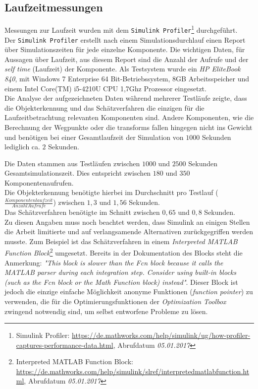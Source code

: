 \subsection{Laufzeitmessungen}
\label{sec_laufzeit}
Messungen zur Laufzeit wurden mit dem \texttt{Simulink Profiler}\footnote{Simulink Profiler: \url{https://de.mathworks.com/help/simulink/ug/how-profiler-captures-performance-data.html}, Abrufdatum \textit{05.01.2017}} durchgeführt.\\ Der \texttt{Simulink Profiler} erstellt nach einem Simulationsdurchlauf einen Report über Simulationszeiten für jede einzelne Komponente. Die wichtigen Daten, für Aussagen über Laufzeit, aus diesem Report sind die Anzahl der Aufrufe und der \textit{self time} (Laufzeit) der Komponente. Als Testsystem wurde ein \textit{HP EliteBook 840}, mit Windows 7 Enterprise 64 Bit-Betriebssystem, $8$GB Arbeitsspeicher und einem Intel Core(TM) i5-4210U CPU 1,7Ghz Prozessor eingesetzt. \\
Die Analyse der aufgezeichneten Daten während mehrerer Testläufe zeigte, dass die Objekterkennung und das Schätzverfahren die einzigen für die Laufzeitbetrachtung relevanten Komponenten sind. Andere Komponenten, wie die Berechnung der Wegpunkte oder die \glspl{transform} fallen hingegen nicht ins Gewicht und benötigen bei einer Gesamtlaufzeit der Simulation von $1000$ Sekunden lediglich ca. $2$ Sekunden. 

Die Daten stammen aus Testläufen zwischen $1000$ und $2500$ Sekunden Gesamtsimulationszeit. Dies entspricht zwischen $180$ und $350$ Komponentenaufrufen.\\
Die Objekterkennung benötigte hierbei im Durchschnitt pro Testlauf ($\frac{Komponentenlaufzeit}{Anzahl Aufrufe}$) zwischen $1,3$ und $1,56$ Sekunden.\\
Das Schätzverfahren benötigte im Schnitt zwischen $0,65$ und $0,8$ Sekunden.\\

Zu diesen Angaben muss noch beachtet werden, dass Simulink an einigen Stellen die Arbeit limitierte und auf verlangsamende Alternativen zurückgegriffen werden musste. Zum Beispiel ist das Schätzverfahren in einem \textit{Interpreted MATLAB Function Block}\footnote{Interpreted MATLAB Function Block: \url{https://de.mathworks.com/help/simulink/slref/interpretedmatlabfunction.html}, Abrufdatum \textit{05.01.2017}} umgesetzt. Bereits in der Dokumentation des Blocks steht die Anmerkung: \textit{"This block is slower than the Fcn block because it calls the MATLAB parser during each integration step. Consider using built-in blocks (such as the Fcn block or the Math Function block) instead"}. Dieser Block ist jedoch die einzige einfache Möglichkeit anonyme Funktionen (\textit{function pointer}) zu verwenden, die für die Optimierungsfunktionen der \textit{Optimization Toolbox} zwingend notwendig sind, um selbst entworfene Probleme zu lösen.
\afterpage{\null\newpage}

%
